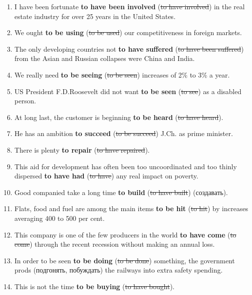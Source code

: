 \documentclass[main.tex]{subfiles}
\begin{document}
\newpage
\setcounter{subsection}{5}


\newpage
\setcounter{subsection}{6}


\begin{enumerate}[nosep,leftmargin=*]
	\itemsep\eitsp
	\item I have been fortunate \textbf{to have been involved} (\sout{to have involved}) in the real estate industry for over 25 years in the United States.
	\item We ought \textbf{to be using} (\sout{to be used}) our competitiveness in foreign markets.
	\item The only developing countries not \textbf{to have suffered} (\sout{to have been suffered}) from the Asian and Russian collapses were China and India.
	\item We really need \textbf{to be seeing} (\sout{to be seen}) increases of 2\% to 3\% a year.
	\item US President F.D.Roosevelt did not want \textbf{to be seen} (\sout{to see}) as a disabled person.
	\item At long last, the customer is beginning \textbf{to be heard} (\sout{to have heard}).
	\item He has an ambition \textbf{to succeed} (\sout{to be succeed}) J.Ch. as prime minister.
	\item There is plenty \textbf{to repair} (\sout{to have repaired}).
	\item This aid for development has often been too uncoordinated and too thinly dispersed \textbf{to have had} (\sout{to have}) any real impact on poverty.
	\item Good companied take a long time \textbf{to build} (\sout{to have built}) (создавать).
	\item Flats, food and fuel are among the main items \textbf{to be hit} (\sout{to hit}) by increases averaging 400 to 500 per cent.
	\item This company is one of the few producers in the world \textbf{to have come} (\sout{to come}) through the recent recession without making an annual loss.
	\item In order to be seen \textbf{to be doing} (\sout{to be done}) something, the government prods (подгонять, побуждать) the railways into extra safety spending.
	\item This is not the time \textbf{to be buying} (\sout{to have bought}).

\end{enumerate}
\end{document}
